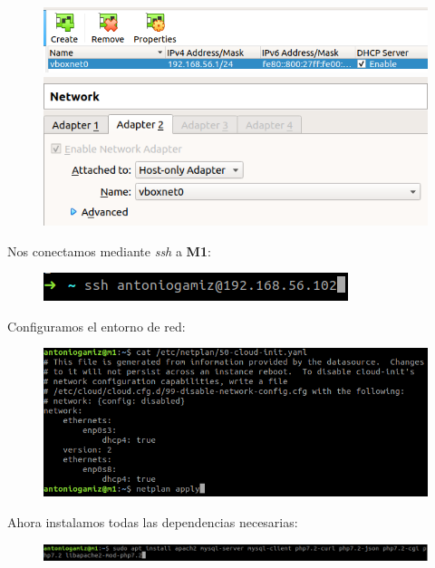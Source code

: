 \documentclass[12pt]{article}
\begin{document}
\begin{figure}[H]
  \center
  \includegraphics[scale=0.5]{img/113.png}\\
  \includegraphics[scale=0.5]{img/114.png}
\end{figure}

Nos conectamos mediante \textit{ssh} a \textbf{M1}:

\begin{figure}[H]
  \center
  \includegraphics[scale=0.5]{img/3.png}
\end{figure}

Configuramos el entorno de red:

\begin{figure}[H]
  \center
  \includegraphics[scale=0.5]{img/111.png}
\end{figure}

Ahora instalamos todas las dependencias necesarias:

\begin{figure}[H]
  \center
  \includegraphics[scale=0.5]{img/112.png}
\end{figure}
\end{document}

